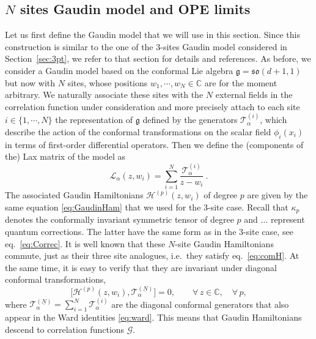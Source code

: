 \documentclass{article}
\def\g{\mathfrak{g}}
\def\Lc{\mathcal{L}}
\def\Hc{\mathcal{H}}
\def\cG{\mathcal{G}}
\begin{document}
\subsection{\texorpdfstring{$N$}{N} sites Gaudin model and OPE limits}
\label{sec:GaudinLim}

Let us first define the Gaudin model that we will use in this section. Since this construction 
is similar to the one of the 3-sites Gaudin model considered in Section~\ref{sec:3pt}, we 
refer to that section for details and references. As before, we consider a Gaudin model based 
on the conformal Lie algebra $\g=\mathfrak{so}(d+1,1)$ but now with $N$ sites, whose positions 
$w_1,\cdots,w_N\in\mathbb{C}$ are for the moment arbitrary. We naturally associate these sites 
with the $N$ external fields in the correlation function under consideration and more precisely 
attach to each site $i\in\lbrace 1,\cdots,N\rbrace$ the representation of $\g$ defined by 
the generators $\mathcal{T}_\alpha^{(i)}$, which describe the action of the conformal 
transformations on the scalar field $\phi_i(x_i)$ in terms of first-order differential 
operators. Then we define the (components of the) Lax matrix of the model as
\begin{equation} \label{eq:LaxN} 
\Lc_\alpha(z,w_i) = \sum_{i=1}^N \frac{\mathcal{T}_\alpha^{(i)}}{z-w_i}\ .
\end{equation}
The associated Gaudin Hamiltonians $\mathcal{H}^{(p)}(z,w_i)$ of degree $p$ are given by the 
same equation \eqref{eq:GaudinHam} that we used for the 3-site case. Recall that $\kappa_p$ denotes the conformally invariant symmetric tensor of degree $p$ and $\dots$ represent quantum corrections. 
The latter have the same form as in the 3-site case, see eq.\ \eqref{eq:Correc}. It is well 
known that these $N$-site Gaudin Hamiltonians commute, just as their three site analogues, i.e.\ 
they satisfy eq.\ \eqref{eq:comH}. At the same time, it is easy to verify that they are invariant 
under diagonal conformal transformations, 
\begin{equation}\label{eq:comDiag}
\bigl[ \Hc^{(p)}(z,w_i), \mathcal{T}^{(\underline{N})}_\alpha \bigr] = 0, \qquad \forall\, z\in\mathbb{C}, \quad \forall\,p,
\end{equation}
where $\mathcal{T}^{(\underline{N})}_\alpha = \sum_{i=1}^N \mathcal{T}^{(i)}_\alpha$ are the 
diagonal conformal generators that also appear in the Ward identities \eqref{eq:ward}. This 
means that Gaudin Hamiltonians descend to correlation functions $\cG$.  
\end{document}
